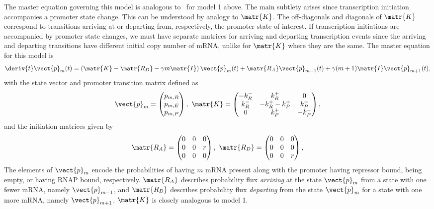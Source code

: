 The master equation governing this model is analogous
to~ for model 1 above. The
main subtlety arises since transcription initiation accompanies a promoter state
change. This can be understood by analogy to $\matr{K}$. The off-diagonals and
diagonals of $\matr{K}$ correspond to transitions arriving at or departing from,
respectively, the promoter state of interest. If transcription initiations are
accompanied by promoter state changes, we must have separate matrices for
arriving and departing transcription events since the arriving and departing
transitions have different initial copy number of mRNA, unlike for $\matr{K}$
where they are the same. The master equation for this model is
\begin{equation}
\deriv{t}\vect{p}_m(t) =
\left( \matr{K} - \matr{R_D} - \gamma m \matr{I} \right) \vect{p}_m(t)
                + \matr{R_A} \vect{p}_{m-1}(t) +
                \gamma (m+1) \matr{I} \vect{p}_{m+1}(t),
\label{eq:3state_rep_cme}
\end{equation}
with the state vector and promoter transition matrix defined as
\begin{equation}
\vect{p}_m = \begin{pmatrix} p_{m,R} \\ p_{m,E} \\ p_{m,P} \end{pmatrix},\
\matr{K} = \begin{pmatrix} -k_R^- & k_R^+ & 0 \\
                        k_R^- & -k_R^+ -k_P^+ & k_P^- \\
                        0 & k_P^+ & -k_P^- 
                \end{pmatrix},
\label{eq:3state_cme_matrices_pt1}
\end{equation}
and the initiation matrices given by
\begin{equation}
\matr{R_A} = \begin{pmatrix}
                0 & 0 & 0 \\ 0 & 0 & r \\ 0 & 0 & 0
                \end{pmatrix},\
\matr{R_D} = \begin{pmatrix}
                0 & 0 & 0 \\ 0 & 0 & 0 \\ 0 & 0 & r
                \end{pmatrix},
\label{eq:3state_cme_matrices_pt2}
\end{equation}
The elements of $\vect{p}_m$ encode the probabilities of having $m$ mRNA present
along with the promoter having repressor bound, being empty, or having RNAP
bound, respectively. $\matr{R_A}$ describes probability flux \textit{arriving}
at the state $\vect{p}_m$ from a state with one fewer mRNA, namely
$\vect{p}_{m-1}$, and $\matr{R_D}$ describes probability flux \textit{departing}
from the state $\vect{p}_m$ for a state with one more mRNA, namely
$\vect{p}_{m+1}$. $\matr{K}$ is closely analogous to model 1.

